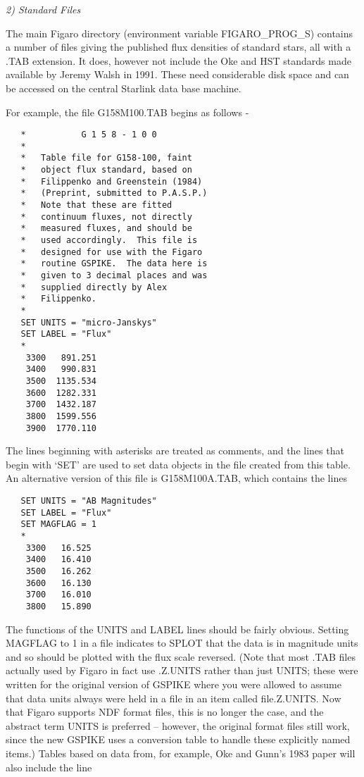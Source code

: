 \goodbreak
\vspace{12pt}
{\it 2) Standard Files}

The main Figaro directory (environment variable FIGARO\_PROG\_S)
contains a number of files giving the published flux densities of
standard stars, all with a .TAB extension.  It does, however not include
the Oke and HST standards made available by Jeremy Walsh in 1991.  These
need considerable disk space and can be accessed on the central Starlink
data base machine.

For example,
the file G158M100.TAB begins as follows -

\goodbreak
\begin{verbatim}
   *           G 1 5 8 - 1 0 0
   *
   *   Table file for G158-100, faint
   *   object flux standard, based on
   *   Filippenko and Greenstein (1984)
   *   (Preprint, submitted to P.A.S.P.)
   *   Note that these are fitted
   *   continuum fluxes, not directly
   *   measured fluxes, and should be
   *   used accordingly.  This file is
   *   designed for use with the Figaro
   *   routine GSPIKE.  The data here is
   *   given to 3 decimal places and was
   *   supplied directly by Alex
   *   Filippenko.
   *
   SET UNITS = "micro-Janskys"
   SET LABEL = "Flux"
   *
    3300   891.251
    3400   990.831
    3500  1135.534
    3600  1282.331
    3700  1432.187
    3800  1599.556
    3900  1770.110
\end{verbatim}
\goodbreak

The lines beginning with asterisks are treated as comments, and the
lines that begin with `SET' are used to set data objects in the file
created from this table.  An alternative version of this file is
G158M100A.TAB, which contains the lines

\goodbreak
\begin{verbatim}
   SET UNITS = "AB Magnitudes"
   SET LABEL = "Flux"
   SET MAGFLAG = 1
   *
    3300   16.525
    3400   16.410
    3500   16.262
    3600   16.130
    3700   16.010
    3800   15.890
\end{verbatim}
\goodbreak

The functions of the UNITS and LABEL lines should be fairly obvious.
Setting MAGFLAG to 1 in a file indicates to SPLOT that the data is in
magnitude units and so should be plotted with the flux scale reversed.
(Note that most .TAB files actually used by Figaro in fact use .Z.UNITS
rather than just UNITS; these were written for the original version of
GSPIKE where you were allowed to assume that data units always were held
in a file in an item called file.Z.UNITS.  Now that Figaro supports NDF
format files, this is no longer the case, and the abstract term UNITS is
preferred -- however, the original format files still work, since the
new GSPIKE uses a conversion table to handle these explicitly named
items.)  Tables based on data from, for example, Oke and Gunn's 1983
paper will also include the line


